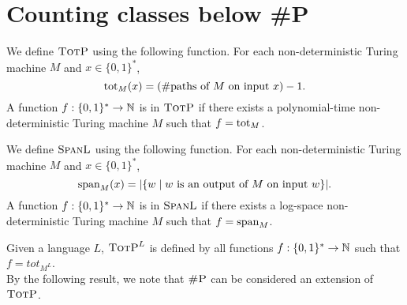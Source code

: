 \section{Counting classes below \#P}

We define $\totp$ using the following function. For each non-deterministic Turing machine $M$ and $x\in\{0,1\}^*$,
\[
	\tot_M(x) = (\text{\#paths of $M$ on input $x$}) - 1.
\]
A function $f:\{0,1\}^*\to\N$ is in $\totp$ if there exists a polynomial-time non-deterministic Turing machine $M$ such that $f = \tot_M$.

We define $\spanl$ using the following function. For each non-deterministic Turing machine $M$ and $x\in\{0,1\}^*$,
\[
	\sp_M(x) = \vert\{w \mid \text{$w$ is an output of $M$ on input $w$}\}\vert.
\]
A function $f:\{0,1\}^*\to\N$ is in $\spanl$ if there exists a log-space non-deterministic Turing machine $M$ such that $f = \sp_M$.

Given a language $L$, $\totp^{L}$ is defined by all functions $f:\{0,1\}^*\to\N$ such that $f = tot_{M^L}$.
\\

By the following result, we note that $\shp$ can be considered an extension of $\totp$.

